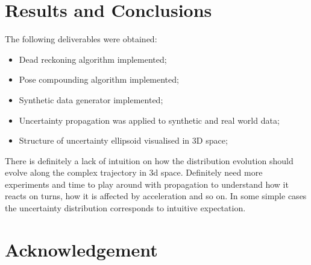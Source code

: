 \documentclass{article}
\begin{document}
\section{Results and Conclusions}
The following deliverables were obtained:
\begin{itemize}
	
	\item Dead reckoning algorithm implemented;
	\item Pose compounding algorithm implemented;
	\item Synthetic data generator implemented;
	\item Uncertainty propagation was applied to synthetic and real world data;
	\item Structure of uncertainty ellipsoid visualised in 3D space;
\end{itemize}

There is definitely a lack of intuition on how the distribution evolution should evolve along the complex trajectory in 3d space. Definitely need more experiments and time to play around with propagation to understand how it reacts on turns, how it is affected by acceleration and so on. In some simple cases the uncertainty distribution corresponds to intuitive expectation.

\section*{Acknowledgement}





\end{document}
